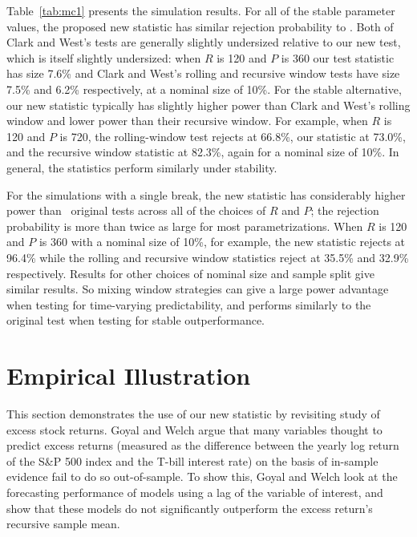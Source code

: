 \documentclass[12pt,fleqn]{article}
\begin{document}
Table~\ref{tab:mc1} presents the simulation results.  For all of the
stable parameter values, the proposed new statistic has similar
rejection probability to .  Both of Clark and West's
tests are generally slightly undersized relative to our new test,
which is itself slightly undersized: when $R$ is 120 and $P$ is 360
our test statistic has size 7.6\% and Clark and West's rolling and
recursive window tests have size 7.5\% and 6.2\% respectively, at a
nominal size of 10\%.  For the stable alternative, our new statistic
typically has slightly higher power than Clark and West's rolling
window and lower power than their recursive window.  For example, when
$R$ is 120 and $P$ is 720, the rolling-window test rejects at 66.8\%,
our statistic at 73.0\%, and the recursive window statistic at 82.3\%,
again for a nominal size of 10\%.  In general, the statistics perform
similarly under stability.

For the simulations with a single break, the new statistic has
considerably higher power than \poscw\ original tests across all of
the choices of $R$ and $P$; the rejection probability is more than
twice as large for most parametrizations.  When $R$ is 120 and $P$ is
360 with a nominal size of 10\%, for example, the new statistic
rejects at 96.4\% while the rolling and recursive window statistics
reject at 35.5\% and 32.9\% respectively.  Results for other choices
of nominal size and sample split give similar results.  So mixing
window strategies can give a large power advantage when testing for
time-varying predictability, and performs similarly to the original
test when testing for stable outperformance.

\section{Empirical Illustration}\label{sec:3}

This section demonstrates the use of our new statistic by revisiting
 study of excess stock returns.  Goyal and Welch argue
that many variables thought to predict excess returns (measured as the
difference between the yearly log return of the S\&P 500 index and the
T-bill interest rate) on the basis of in-sample evidence fail to do so
out-of-sample.  To show this, Goyal and Welch look at the forecasting
performance of models using a lag of the variable of interest, and
show that these models do not significantly outperform the excess
return's recursive sample mean.
\end{document}
